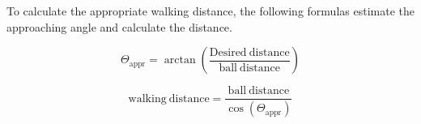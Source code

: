 To calculate the appropriate walking distance, the following formulas estimate the approaching angle and calculate the distance.

\begin{equation}
\Theta_\mathrm{appr}=\arctan\left(\frac{\mathrm{Desired\ distance}}{\mathrm{ball\ distance}} \right)
\end{equation}

\begin{equation}
	\mathrm{walking\ distance}=\frac{\mathrm{ball\ distance}}{\cos(\Theta_\mathrm{appr})}
\end{equation}

       